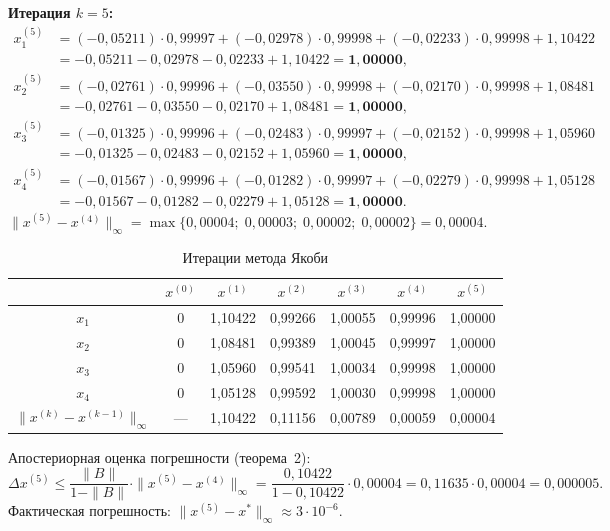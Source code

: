\documentclass[a4paper, final]{article}
\begin{document}
\medskip\textbf{Итерация $k=5$:}
\begin{align*}
x_1^{(5)} &= (-0{,}05211)\cdot0{,}99997 + (-0{,}02978)\cdot0{,}99998 + (-0{,}02233)\cdot0{,}99998 + 1{,}10422\\
           &= -0{,}05211 - 0{,}02978 - 0{,}02233 + 1{,}10422 = \mathbf{1{,}00000},\\
x_2^{(5)} &= (-0{,}02761)\cdot0{,}99996 + (-0{,}03550)\cdot0{,}99998 + (-0{,}02170)\cdot0{,}99998 + 1{,}08481\\
           &= -0{,}02761 - 0{,}03550 - 0{,}02170 + 1{,}08481 = \mathbf{1{,}00000},\\
x_3^{(5)} &= (-0{,}01325)\cdot0{,}99996 + (-0{,}02483)\cdot0{,}99997 + (-0{,}02152)\cdot0{,}99998 + 1{,}05960\\
           &= -0{,}01325 - 0{,}02483 - 0{,}02152 + 1{,}05960 = \mathbf{1{,}00000},\\
x_4^{(5)} &= (-0{,}01567)\cdot0{,}99996 + (-0{,}01282)\cdot0{,}99997 + (-0{,}02279)\cdot0{,}99998 + 1{,}05128\\
           &= -0{,}01567 - 0{,}01282 - 0{,}02279 + 1{,}05128 = \mathbf{1{,}00000}.
\end{align*}
$\|x^{(5)}-x^{(4)}\|_\infty = \max\{0{,}00004;\;0{,}00003;\;0{,}00002;\;0{,}00002\} = 0{,}00004.$

\begin{table}[h!]
\centering
\caption{Итерации метода Якоби}
\label{tab:jacobi}
\renewcommand{\arraystretch}{1.3}
\begin{tabular}{|c|c|c|c|c|c|c|}
\hline
 & $x^{(0)}$ & $x^{(1)}$ & $x^{(2)}$ & $x^{(3)}$ & $x^{(4)}$ & $x^{(5)}$ \\
\hline
$x_1$ & 0 & 1,10422 & 0,99266 & 1,00055 & 0,99996 & 1,00000 \\
$x_2$ & 0 & 1,08481 & 0,99389 & 1,00045 & 0,99997 & 1,00000 \\
$x_3$ & 0 & 1,05960 & 0,99541 & 1,00034 & 0,99998 & 1,00000 \\
$x_4$ & 0 & 1,05128 & 0,99592 & 1,00030 & 0,99998 & 1,00000 \\
\hline
$\|x^{(k)}-x^{(k-1)}\|_\infty$ & --- & 1,10422 & 0,11156 & 0,00789 & 0,00059 & 0,00004 \\
\hline
\end{tabular}
\end{table}

Апостериорная оценка погрешности (теорема~2):
\[
\Delta x^{(5)} \leq \frac{\|B\|}{1-\|B\|}\cdot\|x^{(5)}-x^{(4)}\|_\infty
= \frac{0{,}10422}{1-0{,}10422}\cdot 0{,}00004
= 0{,}11635\cdot 0{,}00004 = 0{,}000005.
\]
Фактическая погрешность: $\|x^{(5)}-x^*\|_\infty \approx 3\cdot10^{-6}.$
\end{document}
